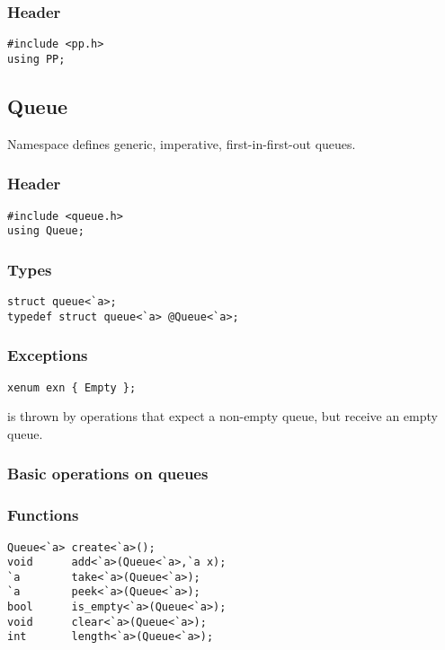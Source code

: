 \subsubsection*{Header}
\begin{verbatim}
#include <pp.h>
using PP;
\end{verbatim}

\subsection{Queue}

Namespace  defines generic, imperative, first-in-first-out
queues.

\subsubsection*{Header}
\begin{verbatim}
#include <queue.h>
using Queue;
\end{verbatim}

\subsubsection*{Types}
\begin{verbatim}
struct queue<`a>;
typedef struct queue<`a> @Queue<`a>;
\end{verbatim}

\subsubsection*{Exceptions}
\begin{verbatim}
xenum exn { Empty };
\end{verbatim}

 is thrown by operations that expect a non-empty queue, but
receive an empty queue.

\subsubsection*{Basic operations on queues}
\subsubsection*{Functions}
\begin{verbatim}
Queue<`a> create<`a>();
void      add<`a>(Queue<`a>,`a x);
`a        take<`a>(Queue<`a>);
`a        peek<`a>(Queue<`a>);
bool      is_empty<`a>(Queue<`a>);
void      clear<`a>(Queue<`a>);
int       length<`a>(Queue<`a>);
\end{verbatim}

